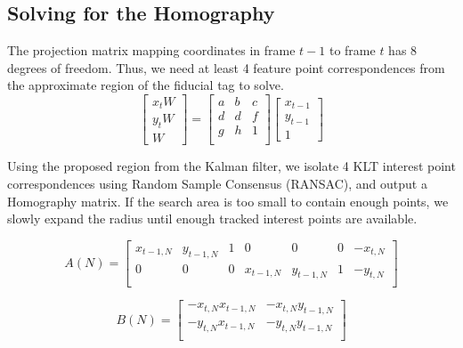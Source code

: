 \documentclass[letterpaper,10pt,conference]{IEEEtran}
\begin{document}
\subsection{Solving for the Homography}
The projection matrix mapping coordinates in frame $t-1$ to frame $t$ has 8 degrees of freedom. Thus, we need at least 4 feature point correspondences from the approximate region of the fiducial tag to solve. 
\begin{equation}
\begin{bmatrix}
x_{t}W\\
y_{t}W\\
W
\end{bmatrix}
= \begin{bmatrix}
a&b&c\\
d&d&f\\
g&h&1\\
\end{bmatrix}
\begin{bmatrix}
x_{t-1}\\
y_{t-1}\\
1
\end{bmatrix}
\end{equation}

Using the proposed region from the Kalman filter, we isolate 4 KLT interest point correspondences using Random Sample Consensus (RANSAC), and output a Homography matrix. If the search area is too small to contain enough points, we slowly expand the radius until enough tracked interest points are available.

\begin{equation}
A(N) = 
\begin{bmatrix}
x_{t-1,N}& y_{t-1,N}&1&0&0&0& -x_{t,N}\\
0&0&0&x_{t-1,N}& y_{t-1,N}&1& -y_{t,N}\\
\end{bmatrix}
\end{equation}

\begin{equation}
B(N) = 
\begin{bmatrix}
-x_{t,N}x_{t-1,N}& -x_{t,N}y_{t-1,N}\\
-y_{t,N}x_{t-1,N} &-y_{t,N}y_{t-1,N}\\
\end{bmatrix}
\end{equation}
\end{document}
